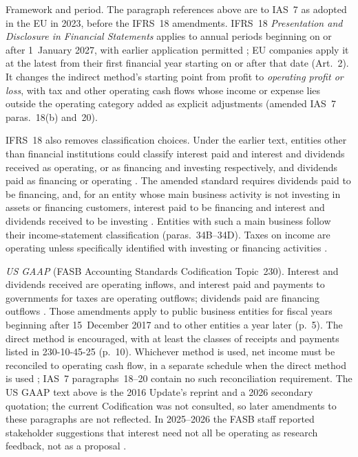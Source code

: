 \begin{qfmethod}
 Framework and period. The paragraph references above are to IAS~7 as adopted in the EU in 2023, before the IFRS~18 amendments. IFRS~18 \emph{Presentation and Disclosure in Financial Statements} applies to annual periods beginning on or after 1~January 2027, with earlier application permitted \citep[Annex, IFRS~18 para.~C1]{eu-2026-338-ifrs18}; EU companies apply it at the latest from their first financial year starting on or after that date (Art.~2). It changes the indirect method's starting point from profit to \emph{operating profit or loss}, with tax and other operating cash flows whose income or expense lies outside the operating category added as explicit adjustments (amended IAS~7 paras.~18(b) and~20).

IFRS~18 also removes classification choices. Under the earlier text, entities other than financial institutions could classify interest paid and interest and dividends received as operating, or as financing and investing respectively, and dividends paid as financing or operating \citep[IAS~7 paras.~33--34]{eu-2023-1803-ias7}. The amended standard requires dividends paid to be financing, and, for an entity whose main business activity is not investing in assets or financing customers, interest paid to be financing and interest and dividends received to be investing \citep[Annex, amended IAS~7 paras.~33A and~34A]{eu-2026-338-ifrs18}. Entities with such a main business follow their income-statement classification (paras.~34B--34D). Taxes on income are operating unless specifically identified with investing or financing activities \citep[IAS~7 para.~35]{eu-2023-1803-ias7}.

\emph{US GAAP} (FASB Accounting Standards Codification Topic~230). Interest and dividends received are operating inflows, and interest paid and payments to governments for taxes are operating outflows; dividends paid are financing outflows \citep[ASC 230-10-45-16(b), 45-17(c)--(d) and 45-15(a), as amended, pp.~9--10 and 14--15]{us-cash-flow-classification-amendment-2016}. Those amendments apply to public business entities for fiscal years beginning after 15~December 2017 and to other entities a year later (p.~5). The direct method is encouraged, with at least the classes of receipts and payments listed in 230-10-45-25 (p.~10). Whichever method is used, net income must be reconciled to operating cash flow, in a separate schedule when the direct method is used \citep[ASC 230-10-45-28 to 45-30, as quoted]{cash-flow-statement-roadmap-2026}; IAS~7 paragraphs~18--20 contain no such reconciliation requirement. The US GAAP text above is the 2016 Update's reprint and a 2026 secondary quotation; the current Codification was not consulted, so later amendments to these paragraphs are not reflected. In 2025--2026 the FASB staff reported stakeholder suggestions that interest need not all be operating as research feedback, not as a proposal \citep[AP35, slides~2--4; AP20A, slide~4]{cash-flow-standard-setting-2026}.


\end{qfmethod}
